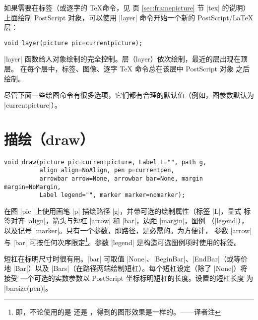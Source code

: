 \documentclass{ctexbook}
\newcommand*\prgname[1]{\textsf{#1}}
\newcommand\transnote[1]{\footnote{#1——译者注}}
\begin{document}
如果需要在标签（或逐字的 \TeX 命令，见 \pageref{sec:framepicture} 页
\ref{sec:framepicture} 节 |tex| 的说明）上面绘制 \prgname{PostScript}
对象，可以使用 |layer| 命令开始一个新的 \prgname{PostScript}/\LaTeX{} 层：
\begin{lstlisting}
void layer(picture pic=currentpicture);
\end{lstlisting}
|layer| 函数给人对象绘制的完全控制。层（layer）依次绘制，最近的层出现在顶层。
在每个层中，标签、图像、逐字 \TeX{} 命令总在该层中 \prgname{PostScript} 对象
之后绘制。

尽管下面一些绘图命令有很多选项，它们都有合理的默认值（例如，图参数默认为
|currentpicture|）。


\section{描绘（draw）}

\begin{lstlisting}
void draw(picture pic=currentpicture, Label L="", path g,
          align align=NoAlign, pen p=currentpen,
          arrowbar arrow=None, arrowbar bar=None, margin margin=NoMargin,
          Label legend="", marker marker=nomarker);
\end{lstlisting}
在图 |pic| 上使用画笔 |p| 描绘路径 |g|，并带可选的绘制属性（标签 |L|，显式
标签对齐 |align|，箭头与短杠 |arrow| 和 |bar|，边距 |margin|，图例
（|legend|），以及记号 |marker|。只有一个参数，即路径，是必需的。为方便计，
参数 |arrow| 与 |bar| 可按任何次序限定\transnote{即，不论使用的是
 还是
\inlinecode{draw(g, EndArrow, BeginBar)}，得到的图形效果是一样的。}。参数
|legend| 是构造可选图例项时使用的标签。

短杠在标明尺寸时很有用。|bar| 可取值 |None|、|BeginBar|、|EndBar|（或等价地
|Bar|）以及 |Bars|（在路径两端绘制短杠）。每个短杠设定（除了 |None|）将接受
一个可选的实数参数以 \prgname{PostScript} 坐标标明短杠的长度。设置的短杠长度
为 |barsize(pen)|。
\end{document}
